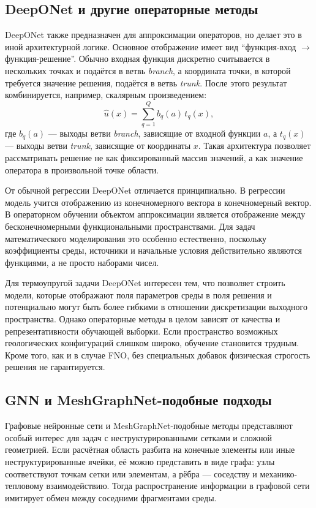 \subsection*{DeepONet и другие операторные методы}

DeepONet также предназначен для аппроксимации операторов, но делает это в иной архитектурной логике. Основное отображение имеет вид ``функция-вход $\to$ функция-решение''. Обычно входная функция дискретно считывается в нескольких точках и подаётся в ветвь \textit{branch}, а координата точки, в которой требуется значение решения, подаётся в ветвь \textit{trunk}. После этого результат комбинируется, например, скалярным произведением:
\begin{equation}
\hat u(x)=\sum_{q=1}^{Q} b_q(a)\,t_q(x),
\end{equation}
где $b_q(a)$ --- выходы ветви \textit{branch}, зависящие от входной функции $a$, а $t_q(x)$ --- выходы ветви \textit{trunk}, зависящие от координаты $x$. Такая архитектура позволяет рассматривать решение не как фиксированный массив значений, а как значение оператора в произвольной точке области.

От обычной регрессии DeepONet отличается принципиально. В регрессии модель учится отображению из конечномерного вектора в конечномерный вектор. В операторном обучении объектом аппроксимации является отображение между бесконечномерными функциональными пространствами. Для задач математического моделирования это особенно естественно, поскольку коэффициенты среды, источники и начальные условия действительно являются функциями, а не просто наборами чисел.

Для термоупругой задачи DeepONet интересен тем, что позволяет строить модели, которые отображают поля параметров среды в поля решения и потенциально могут быть более гибкими в отношении дискретизации выходного пространства. Однако операторные методы в целом зависят от качества и репрезентативности обучающей выборки. Если пространство возможных геологических конфигураций слишком широко, обучение становится трудным. Кроме того, как и в случае FNO, без специальных добавок физическая строгость решения не гарантируется.

\subsection*{GNN и MeshGraphNet-подобные подходы}

Графовые нейронные сети и MeshGraphNet-подобные методы представляют особый интерес для задач с неструктурированными сетками и сложной геометрией. Если расчётная область разбита на конечные элементы или иные неструктурированные ячейки, её можно представить в виде графа: узлы соответствуют точкам сетки или элементам, а рёбра --- соседству и механико-тепловому взаимодействию. Тогда распространение информации в графовой сети имитирует обмен между соседними фрагментами среды.

